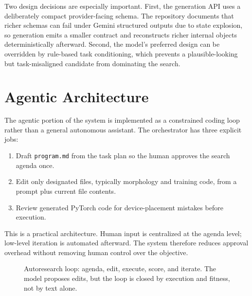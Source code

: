\documentclass[10pt,letterpaper,twocolumn]{article}
\begin{document}
Two design decisions are especially important. First, the generation API uses a deliberately compact provider-facing schema. The repository documents that richer schemas can fail under Gemini structured outputs due to state explosion, so generation emits a smaller contract and reconstructs richer internal objects deterministically afterward. Second, the model's preferred design can be overridden by rule-based task conditioning, which prevents a plausible-looking but task-misaligned candidate from dominating the search.

\section{Agentic Architecture}

The agentic portion of the system is implemented as a constrained coding loop rather than a general autonomous assistant. The orchestrator has three explicit jobs:

\begin{enumerate}[leftmargin=4mm,itemsep=1pt]
\item Draft \texttt{program.md} from the task plan so the human approves the search agenda once.
\item Edit only designated files, typically morphology and training code, from a prompt plus current file contents.
\item Review generated PyTorch code for device-placement mistakes before execution.
\end{enumerate}

This is a practical architecture. Human input is centralized at the agenda level; low-level iteration is automated afterward. The system therefore reduces approval overhead without removing human control over the objective.

\begin{figure}[t]
\centering
{}
\caption{Autoresearch loop: agenda, edit, execute, score, and iterate. The model proposes edits, but the loop is closed by execution and fitness, not by text alone.}
\label{fig:loop}
\end{figure}
\end{document}
